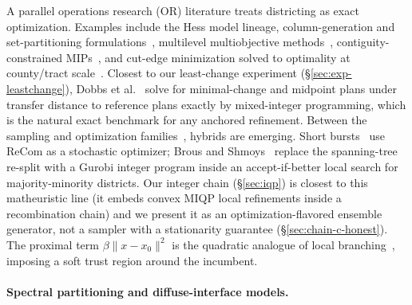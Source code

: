 \documentclass[11pt]{article}
\begin{document}
A parallel operations research (OR) literature treats districting as
exact optimization. Examples include the Hess model lineage,
column-generation and set-partitioning
formulations~\cite{gurnee2021fairmandering}, multilevel
multiobjective methods~\cite{swamy2023multiobjective},
contiguity-constrained MIPs~\cite{validi2022imposing}, and cut-edge
minimization solved to optimality at county/tract
scale~\cite{validi2022political}. Closest to our least-change
experiment (\S\ref{sec:exp-leastchange}), Dobbs et
al.~\cite{dobbs2024facilitating} solve for minimal-change and
midpoint plans under transfer distance to reference plans exactly by
mixed-integer programming, which is the natural exact benchmark for
any anchored refinement. Between the sampling and optimization
families~\cite{becker2022redistricting}, hybrids are emerging. Short bursts~\cite{cannon2023voting} use ReCom
as a stochastic optimizer; Brous and Shmoys~\cite{brous2025recom}
replace the spanning-tree re-split with a Gurobi integer program
inside an accept-if-better local search for majority-minority
districts. Our integer chain (\S\ref{sec:iqp}) is closest to this
matheuristic line (it embeds convex MIQP local refinements inside a
recombination chain) and we present it as an
optimization-flavored ensemble generator, not a sampler with a
stationarity guarantee (\S\ref{sec:chain-c-honest}). The proximal
term $\beta\|x - x_0\|^2$ is the quadratic analogue of local
branching~\cite{fischetti2003local}, imposing a soft trust region
around the incumbent.

\paragraph{Spectral partitioning and diffuse-interface models.}\label{sec:related-spectral}
\end{document}

